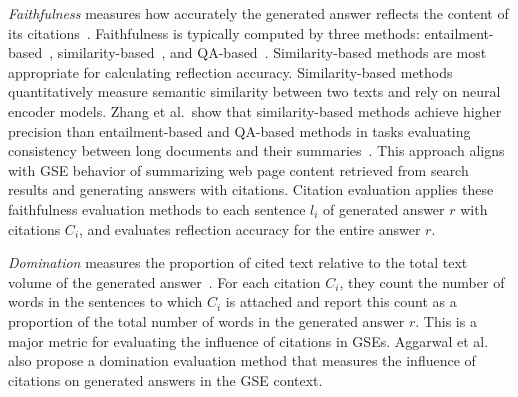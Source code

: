 \emph{Faithfulness} measures how accurately the generated answer reflects the content of its citations~\cite{citeeval-acl25, ragas-eacl24, ares-naacl24, evaluating-verifiability-in-generative-search-engines-emnlp23, enabling-llms-to-generate-text-with-citations-emnlp23, ranking-generated-summaries-by-correctness-acl2019, evaluating-the-factual-consistency-of-abstractive-text-summarization-emnlp20, alignscore-acl23, feqa-acl20}.
Faithfulness is typically computed by three methods: entailment-based~\cite{ranking-generated-summaries-by-correctness-acl2019, true-reevaluating-factual-consistency-arxiv22, evaluating-the-factual-consistency-of-abstractive-text-summarization-emnlp20, alignscore-acl23}, similarity-based~\cite{bertscore-arxiv20, bartscore-neurips21}, and QA-based~\cite{feqa-acl20}.
Similarity-based methods are most appropriate for calculating reflection accuracy.
Similarity-based methods quantitatively measure semantic similarity between two texts and rely on neural encoder models.
Zhang et al.\ show that similarity-based methods achieve higher precision than entailment-based and QA-based methods in tasks evaluating consistency between long documents and their summaries~\cite{finegrainedcitationevaluationgenerated-arxiv24}.
This approach aligns with GSE behavior of summarizing web page content retrieved from search results and generating answers with citations.
Citation evaluation applies these faithfulness evaluation methods to each sentence $ l_i $ of generated answer $ r $ with citations $ C_i $, and evaluates reflection accuracy for the entire answer $ r $.

\emph{Domination} measures the proportion of cited text relative to the total text volume of the generated answer~\cite{geo-apmr+24, wu2025generativesearchengineslikeai}.
For each citation $ C_i $, they count the number of words in the sentences to which $ C_i $ is attached and report this count as a proportion of the total number of words in the generated answer $ r $.
This is a major metric for evaluating the influence of citations in GSEs.
Aggarwal et al.~\cite{geo-apmr+24} also propose a domination evaluation method that measures the influence of citations on generated answers in the GSE context.

